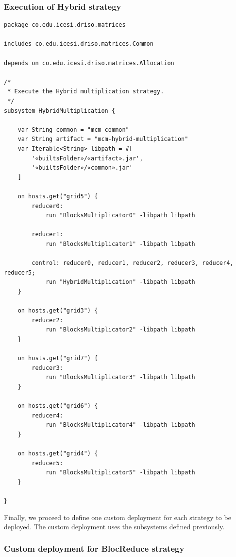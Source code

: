 \documentclass{article}
\begin{document}
\subsubsection{Execution of Hybrid strategy}

\begin{lstlisting}[style=amelia,caption=Subsystem for executing Hybrid strategy.]
package co.edu.icesi.driso.matrices

includes co.edu.icesi.driso.matrices.Common

depends on co.edu.icesi.driso.matrices.Allocation

/*
 * Execute the Hybrid multiplication strategy.
 */
subsystem HybridMultiplication {
	
	var String common = "mcm-common"
	var String artifact = "mcm-hybrid-multiplication"
	var Iterable<String> libpath = #[
        '«builtsFolder»/«artifact».jar',
        '«builtsFolder»/«common».jar'
	]

    on hosts.get("grid5") {
        reducer0:
			run "BlocksMultiplicator0" -libpath libpath

        reducer1:
			run "BlocksMultiplicator1" -libpath libpath

        control: reducer0, reducer1, reducer2, reducer3, reducer4, reducer5;
			run "HybridMultiplication" -libpath libpath
	}
	
	on hosts.get("grid3") {
		reducer2:
			run "BlocksMultiplicator2" -libpath libpath
	}
	
	on hosts.get("grid7") {
		reducer3:
			run "BlocksMultiplicator3" -libpath libpath
	}
	
	on hosts.get("grid6") {
		reducer4:
			run "BlocksMultiplicator4" -libpath libpath
	}
	
	on hosts.get("grid4") {
		reducer5:
			run "BlocksMultiplicator5" -libpath libpath
	}
	
}
\end{lstlisting}

Finally, we proceed to define one custom deployment for each strategy to be deployed. The custom deployment uses the subsystems defined previously. \\

\subsubsection{Custom deployment for BlocReduce strategy}
\end{document}
